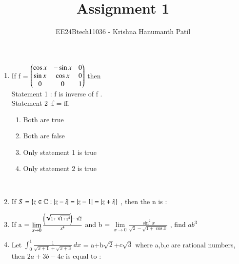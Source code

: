 \documentclass[journal,12pt,onecolumn]{IEEEtran}
\theoremstyle{remark}
\begin{document}
\title{Assignment 1}
\author{EE24Btech11036 - Krishna Hanumanth Patil}
\maketitle
\renewcommand{\thefigure}{\theenumi}
\renewcommand{\thetable}{\theenumi}
\begin{enumerate}
\item If f = $ \begin{pmatrix}\cos{x} & -\sin{x} & 0 \\ \sin{x} & \cos{x} & 0 \\ 0 & 0 & 1 \end{pmatrix} $ then \\ Statement 1 : f is inverse of f . \\ Statement 2 :f = ff. \\
\begin{enumerate}
\item Both are true 
\item Both are false 
\item Only statement 1 is true 
\item Only statement 2 is true 
\end{enumerate} \\ 
\item If $S=\left\{z\in\mathbb{C}:\left\vert z-i\right\vert=\left\vert z-1\right\vert=\left\vert z+i\right\vert\right\}$ , then the n is : \\
\begin{enumerate}
\end{enumerate}
\item If a = $ \lim\limits_{x\to0} \frac{\left(\sqrt{1+\sqrt{1+x^4}}\right)-\sqrt{2}}{x^4} $ and  b = $ \lim\limits_{x\to0} \frac{\sin^2{x}}{\sqrt{2}-\sqrt{1+\cos{x}}} $ , find $ ab^3 $ \\
\begin{enumerate}
\end{enumerate}
\item Let $ \int_0^1 \frac{1}{\sqrt{x+1}+\sqrt{x+3}} \, dx $ = a+b$ \sqrt{2} $+$ c\sqrt{3} $ where a,b,c are rational numbers, then  $ 2a+3b-4c $ is equal to : \\

\end{enumerate}
\end{document}
